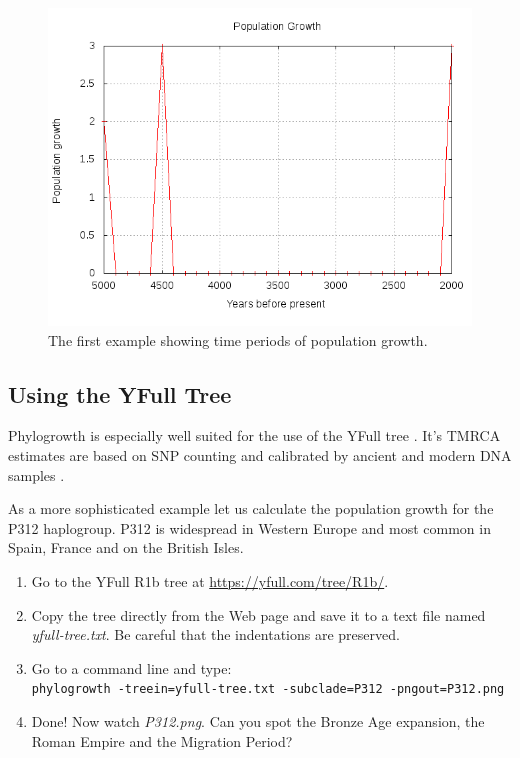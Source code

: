 \begin{figure}[ht]
\centering
\includegraphics[width=13cm]{img/example.png}
\caption{The first example showing time periods of population
growth.}
\end{figure}

\pagebreak


\subsection{Using the YFull Tree}

Phylogrowth is especially well suited for the use of the YFull
tree \cite{YFullTree}. It's TMRCA estimates are based on SNP
counting and calibrated by ancient and modern DNA samples
\cite{YFullMutationRate}.

As a more sophisticated example let us calculate the population
growth for the P312 haplogroup. P312 is widespread in Western
Europe and most common in Spain, France and on the British Isles.

\begin{enumerate}
\item Go to the YFull R1b tree at
	\href{https://yfull.com/tree/R1b/}{https://yfull.com/tree/R1b/}.
\item Copy the tree directly from the Web page and save it
	to a text file named \emph{yfull-tree.txt}.
	Be careful that the indentations are preserved.
\item Go to a command line and type:\\
	\texttt{phylogrowth -treein=yfull-tree.txt -subclade=P312 -pngout=P312.png}
\item Done! Now watch \emph{P312.png}. Can you spot the Bronze Age
	expansion, the Roman Empire and the Migration Period?
\end{enumerate}


